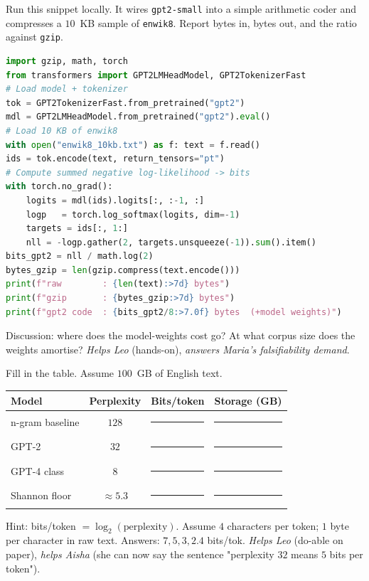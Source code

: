 \documentclass[12pt,a4paper]{article}
\theoremstyle{plain}
\theoremstyle{definition}
\begin{document}
\begin{activity}[title={Activity 2 --- LLM as compressor (Python)}]
Run this snippet locally.  It wires \texttt{gpt2-small} into a
simple arithmetic coder and compresses a $10$~KB sample of
\texttt{enwik8}.  Report bytes in, bytes out, and the ratio
against \texttt{gzip}.
\begin{lstlisting}[language=Python]
import gzip, math, torch
from transformers import GPT2LMHeadModel, GPT2TokenizerFast
# Load model + tokenizer
tok = GPT2TokenizerFast.from_pretrained("gpt2")
mdl = GPT2LMHeadModel.from_pretrained("gpt2").eval()
# Load 10 KB of enwik8
with open("enwik8_10kb.txt") as f: text = f.read()
ids = tok.encode(text, return_tensors="pt")
# Compute summed negative log-likelihood -> bits
with torch.no_grad():
    logits = mdl(ids).logits[:, :-1, :]
    logp   = torch.log_softmax(logits, dim=-1)
    targets = ids[:, 1:]
    nll = -logp.gather(2, targets.unsqueeze(-1)).sum().item()
bits_gpt2 = nll / math.log(2)
bytes_gzip = len(gzip.compress(text.encode()))
print(f"raw        : {len(text):>7d} bytes")
print(f"gzip       : {bytes_gzip:>7d} bytes")
print(f"gpt2 code  : {bits_gpt2/8:>7.0f} bytes  (+model weights)")
\end{lstlisting}
Discussion: where does the model-weights cost go?  At what corpus
size does the weights amortise?  \emph{Helps Leo} (hands-on),
\emph{answers Maria's falsifiability demand}.
\end{activity}

\begin{activity}[title={Activity 3 --- Perplexity-to-bits worksheet}]
Fill in the table.  Assume $100$~GB of English text.
\medskip

\noindent
\begin{tabular}{lccc}
\hline
Model           & Perplexity & Bits/token & Storage (GB) \\
\hline
n-gram baseline & $128$      & \rule{1.5cm}{0.3pt} & \rule{1.5cm}{0.3pt} \\
GPT-2           & $32$       & \rule{1.5cm}{0.3pt} & \rule{1.5cm}{0.3pt} \\
GPT-4 class     & $8$        & \rule{1.5cm}{0.3pt} & \rule{1.5cm}{0.3pt} \\
Shannon floor   & $\approx 5.3$ & \rule{1.5cm}{0.3pt} & \rule{1.5cm}{0.3pt} \\
\hline
\end{tabular}

\medskip
Hint: bits/token $= \log_2(\text{perplexity})$.  Assume $4$
characters per token; $1$ byte per character in raw text.
Answers: $7, 5, 3, 2.4$ bits/tok.  \emph{Helps Leo}
(do-able on paper), \emph{helps Aisha} (she can now say the
sentence "perplexity $32$ means $5$ bits per token").
\end{activity}
\end{document}
